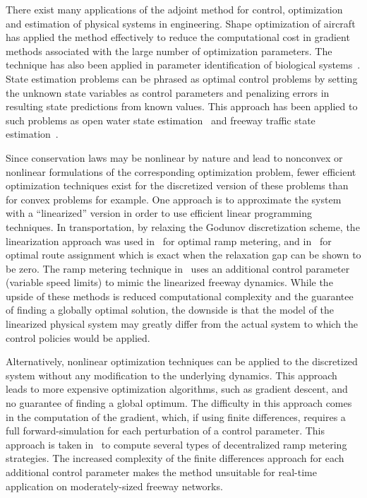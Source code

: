 There exist many applications of the adjoint method for control, optimization 
and estimation of physical systems in engineering. Shape optimization of 
aircraft~\cite{Reuther1996,Giles1997,Moin1994} has applied the method 
effectively to reduce the computational cost in gradient methods associated 
with the large number of optimization parameters. The technique has also been 
applied in parameter identification of biological systems~\cite{Raffard2008}. 
State estimation problems can be phrased as optimal control problems by setting 
the unknown state variables as control parameters and penalizing errors in 
resulting state predictions from known values. This approach has been applied 
to such problems as open water state estimation~\cite{Castaings2006,Strub2009} 
and freeway traffic state estimation~\cite{Jacqueta}.

Since conservation laws may be nonlinear by nature and lead to nonconvex or 
nonlinear formulations of the corresponding optimization problem, fewer 
efficient optimization techniques exist for the 
discretized version of these problems than for convex problems for example. One 
approach is to approximate the system with a ``linearized'' version in order to 
use efficient linear programming techniques. In transportation, by 
relaxing the Godunov discretization scheme, the linearization approach was used 
in~\cite{gomes2006optimal} for optimal ramp metering, and 
in~\cite{ziliaskopoulos2000linear} for optimal route assignment which is exact 
when the relaxation gap can be shown to be zero. The ramp 
metering technique in~\cite{Muralidharana} uses an additional control parameter 
(variable speed limits) to mimic the linearized freeway dynamics. While the 
upside of these methods is reduced computational complexity and the guarantee 
of finding a globally optimal solution, the downside is that the model of the 
linearized physical system may greatly differ from the actual system to which 
the control policies would be applied.

Alternatively, nonlinear optimization techniques can be applied to the 
discretized system without any modification to the underlying dynamics. This 
approach leads to more expensive optimization algorithms, such as gradient 
descent, and no guarantee of finding a global optimum. The difficulty in this 
approach comes in the computation of the gradient, which, if using finite 
differences, requires a full forward-simulation for each perturbation of a 
control parameter. This approach is taken in~\cite{Ramon2013,Frejo2011} to 
compute several types of decentralized ramp metering strategies. The increased 
complexity of the finite differences approach for each additional control 
parameter makes the method unsuitable for real-time application on 
moderately-sized freeway networks.


